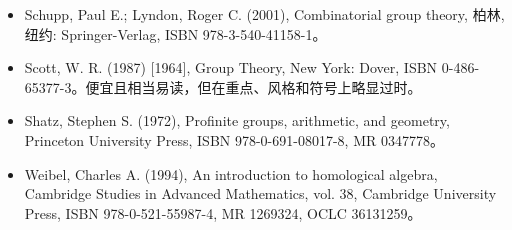 \begin{itemize}
\item Schupp, Paul E.; Lyndon, Roger C. (2001), Combinatorial group theory, 柏林, 纽约: Springer-Verlag, ISBN 978-3-540-41158-1。
\item Scott, W. R. (1987) [1964], Group Theory, New York: Dover, ISBN 0-486-65377-3。便宜且相当易读，但在重点、风格和符号上略显过时。
\item Shatz, Stephen S. (1972), Profinite groups, arithmetic, and geometry, Princeton University Press, ISBN 978-0-691-08017-8, MR 0347778。
\item Weibel, Charles A. (1994), An introduction to homological algebra, Cambridge Studies in Advanced Mathematics, vol. 38, Cambridge University Press, ISBN 978-0-521-55987-4, MR 1269324, OCLC 36131259。
\end{itemize}


